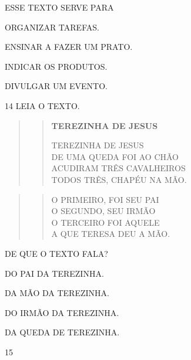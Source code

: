 ESSE TEXTO SERVE PARA

\begin{escolha}
\item ORGANIZAR TAREFAS.

\item ENSINAR A FAZER UM PRATO.

\item INDICAR OS PRODUTOS.

\item DIVULGAR UM EVENTO.
\end{escolha}

\num{14} LEIA O TEXTO. \enlargethispage{2\baselineskip}

\begin{quote}
\begin{verse}
\textbf{TEREZINHA DE JESUS}

TEREZINHA DE JESUS\\
DE UMA QUEDA FOI AO CHÃO\\
ACUDIRAM TRÊS CAVALHEIROS\\
TODOS TRÊS, CHAPÉU NA MÃO.
\end{verse}
\end{quote}

\begin{quote}
\begin{verse}
O PRIMEIRO, FOI SEU PAI\\
O SEGUNDO, SEU IRMÃO\\
O TERCEIRO FOI AQUELE\\
A QUE TERESA DEU A MÃO.

\end{verse}
\end{quote}

DE QUE O TEXTO FALA?

\begin{escolha}
\item DO PAI DA TEREZINHA.

\item DA MÃO DA TEREZINHA.

\item DO IRMÃO DA TEREZINHA.

\item DA QUEDA DE TEREZINHA.
\end{escolha}

\num{15} \enlargethispage{2\baselineskip}

